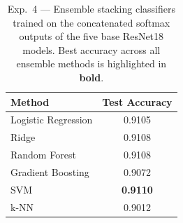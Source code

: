\begin{table}[H]
\centering
\caption{Exp.\ 4 --- Ensemble stacking classifiers trained on the concatenated softmax outputs of the five base ResNet18 models. Best accuracy across all ensemble methods is highlighted in \textbf{bold}.}
\label{tab:exp4_stacking}
\small
\begin{tabular}{lc}
\toprule
\textbf{Method} & \textbf{Test Accuracy} \\
\midrule
Logistic Regression & 0.9105 \\
Ridge & 0.9108 \\
Random Forest & 0.9108 \\
Gradient Boosting & 0.9072 \\
SVM & \textbf{0.9110} \\
k-NN & 0.9012 \\
\bottomrule
\end{tabular}
\end{table}
